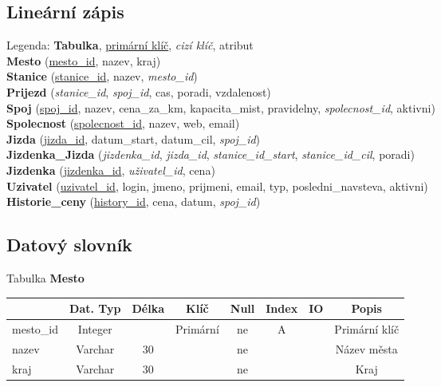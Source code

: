 \documentclass[11pt]{article}
\begin{document}
\newpage

\subsection{Lineární zápis}
Legenda: \textbf{Tabulka}, \underline{primární klíč}, \textit{cizí klíč}, atribut\\
\noindent
\textbf{Mesto} (\underline{mesto\_id}, nazev, kraj)\\
\textbf{Stanice} (\underline{stanice\_id}, nazev, \textit{mesto\_id})\\
\textbf{Prijezd} (\textit{stanice\_id}, \textit{spoj\_id}, cas, poradi, vzdalenost)\\
\textbf{Spoj} (\underline{spoj\_id}, nazev, cena\_za\_km, kapacita\_mist, pravidelny, \textit{spolecnost\_id}, aktivni)\\
\textbf{Spolecnost} (\underline{spolecnost\_id}, nazev, web, email)\\
\textbf{Jizda} (\underline{jizda\_id}, datum\_start, datum\_cil, \textit{spoj\_id})\\
\textbf{Jizdenka\_Jizda} (\textit{jizdenka\_id}, \textit{jizda\_id}, \textit{stanice\_id\_start}, \textit{stanice\_id\_cil}, poradi)\\
\textbf{Jizdenka} (\underline{jizdenka\_id}, \textit{uživatel\_id}, cena)\\
\textbf{Uzivatel} (\underline{uzivatel\_id}, login, jmeno, prijmeni, email, typ, posledni\_navsteva, aktivni)\\
\textbf{Historie\_ceny} (\underline{history\_id}, cena, datum, \textit{spoj\_id})\\

\subsection{Datový slovník}

Tabulka \textbf{Mesto}

\begin{table}[H]
    \begin{tabular}{|l|c|c|c|c|c|c|c|} \hline
                & Dat. Typ  & Délka & Klíč      & Null  & Index & IO    & Popis \\ \hline
    mesto\_id   & Integer   &       & Primární  & ne    & A     &       & Primární klíč \\ \hline
    nazev       & Varchar   & 30    &           & ne    &       &       & Název města \\ \hline
    kraj        & Varchar   & 30    &           & ne    &       &       & Kraj \\ \hline
    \end{tabular}
\end{table}
\end{document}
